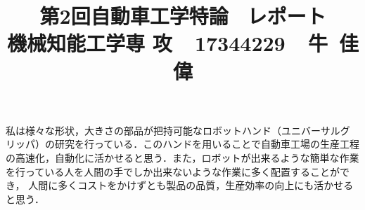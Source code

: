 \documentclass[a4paper,12pt]{jarticle}
\begin{document}
%
\title{\vspace{-30mm}  第2回自動車工学特論 \ レポート \\ 機械知能工学専
攻~~17344229~~牛~佳偉}
\date{}
%
\maketitle
%
\vspace{-20mm}
%
私は様々な形状，大きさの部品が把持可能なロボットハンド（ユニバーサルグ
リッパ）の研究を行っている．このハンドを用いることで自動車工場の生産工程
の高速化，自動化に活かせると思う．また，ロボットが出来るような簡単な作業
を行っている人を人間の手でしか出来ないような作業に多く配置することができ，
人間に多くコストをかけずとも製品の品質，生産効率の向上にも活かせると思う．
\end{document}
